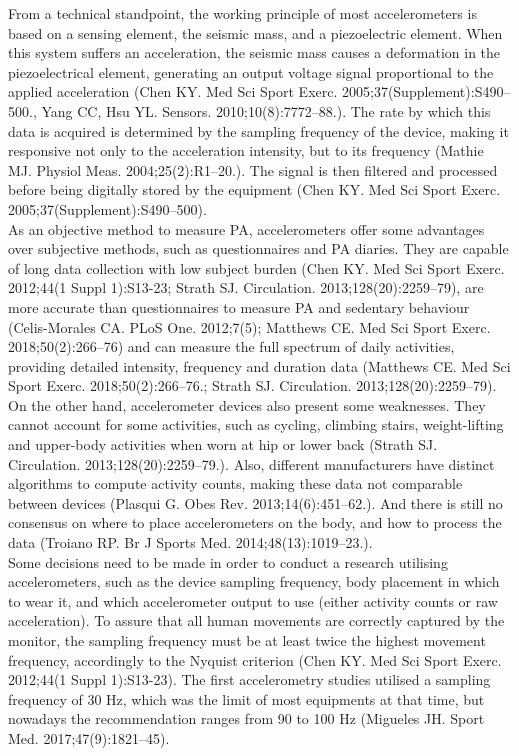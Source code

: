 \documentclass[11pt]{article}
\begin{document}
From a technical standpoint, the working principle of most accelerometers is based on a sensing element, the seismic mass, and a piezoelectric element. When this system suffers an acceleration, the seismic mass causes a deformation in the piezoelectrical element, generating an output voltage signal proportional to the applied acceleration {\tiny (Chen KY. Med Sci Sport Exerc. 2005;37(Supplement):S490–500., Yang CC, Hsu YL. Sensors. 2010;10(8):7772–88.)}. The rate by which this data is acquired is determined by the sampling frequency of the device, making it responsive not only to the acceleration intensity, but to its frequency {\tiny (Mathie MJ. Physiol Meas. 2004;25(2):R1–20.)}. The signal is then filtered and processed before being digitally stored by the equipment {\tiny (Chen KY. Med Sci Sport Exerc. 2005;37(Supplement):S490–500)}. \\

As an objective method to measure PA, accelerometers offer some advantages over subjective methods, such as questionnaires and PA diaries. They are capable of long data collection with low subject burden {\tiny (Chen KY. Med Sci Sport Exerc. 2012;44(1 Suppl 1):S13-23; Strath SJ. Circulation. 2013;128(20):2259–79)}, are more accurate than questionnaires to measure PA and sedentary behaviour {\tiny (Celis-Morales CA. PLoS One. 2012;7(5); Matthews CE. Med Sci Sport Exerc. 2018;50(2):266–76)} and can measure the full spectrum of daily activities, providing detailed intensity, frequency and duration data {\tiny (Matthews CE. Med Sci Sport Exerc. 2018;50(2):266–76.; Strath SJ. Circulation. 2013;128(20):2259–79)}. \\

On the other hand, accelerometer devices also present some weaknesses. They cannot account for some activities, such as cycling, climbing stairs, weight-lifting and upper-body activities when worn at hip or lower back {\tiny (Strath SJ. Circulation. 2013;128(20):2259–79.)}. Also, different manufacturers have distinct algorithms to compute activity counts, making these data not comparable between devices {\tiny (Plasqui G. Obes Rev. 2013;14(6):451–62.)}. And there is still no consensus on where to place accelerometers on the body, and how to process the data {\tiny (Troiano RP. Br J Sports Med. 2014;48(13):1019–23.)}. \\

Some decisions need to be made in order to conduct a research utilising accelerometers, such as the device sampling frequency, body placement in which to wear it, and which accelerometer output to use (either activity counts or raw acceleration). To assure that all human movements are correctly captured by the monitor, the sampling frequency must be at least twice the highest movement frequency, accordingly to the Nyquist criterion {\tiny (Chen KY. Med Sci Sport Exerc. 2012;44(1 Suppl 1):S13-23)}. The first accelerometry studies utilised a sampling frequency of 30 Hz, which was the limit of most equipments at that time, but nowadays the recommendation ranges from 90 to 100 Hz {\tiny (Migueles JH. Sport Med. 2017;47(9):1821–45)}. \\
\end{document}
